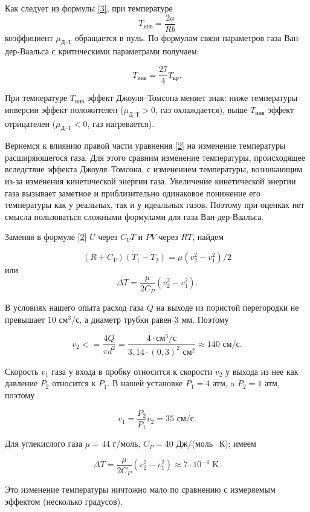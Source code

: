 \documentclass[a4paper,12pt]{article} %
\begin{document}
Как следует из формулы \eqref{3}, при температуре \[ T_{\text{инв}} = \frac{2a}{Rb} \] коэффициент $ \mu_\text{Д--Т} $ обращается в нуль. По формулам связи параметров газа Ван-дер-Ваальса с критическими параметрами получаем: 

\begin{equation}\label{4}
T_\text{инв} = \frac{27}{4} T_\text{кр}.
\end{equation}

При температуре $ T_\text{инв} $ эффект Джоуля–Томсона меняет знак: ниже температуры инверсии эффект положителен ($ \mu_\text{Д--Т} > 0 $, газ охлаждается), выше $ T_\text{инв} $ эффект отрицателен ($ \mu_\text{Д--Т} < 0 $, газ нагревается).

Вернемся к влиянию правой части уравнения \eqref{2} на изменение температуры расширяющегося газа. Для этого сравним изменение температуры, происходящее вследствие эффекта Джоуля–Томсона, с изменением температуры, возникающим из-за изменения кинетической энергии газа. Увеличение кинетической энергии газа вызывает заметное и приблизительно одинаковое понижение его температуры как у реальных, так и у идеальных газов. Поэтому при оценках нет смысла пользоваться сложными формулами для газа Ван-дер-Ваальса.

Заменяя в формуле \eqref{2} $ U $ через $ C_VT $ и $ PV $ через $ RT $, найдем

\[ \left(R+C_V\right)\left(T_1-T_2\right)=\mu\left(v_2^2-v_1^2\right)/2 \]
или
\[ \Delta T = \frac{\mu}{2C_P}\left(v_2^2-v_1^2\right). \]

В условиях нашего опыта расход газа $ Q  $ на выходе из пористой перегородки не превышает $ 10 $ см$ ^3 $/с, а диаметр трубки равен 3 мм. Поэтому

\[ v_2<=\frac{4Q}{\pi d^2} = \frac{4\cdot\text{см}^3/\text{с}}{3,14\cdot(0,3)^2\text{ см}^2} \approx 140 \text{ см}/\text{с}. \]

Скорость $ v_1 $ газа у входа в пробку относится к скорости $ v_2 $ у выхода из нее как давление $ P_2 $ относится к $ P_1 $. В нашей установке $ P_1 = 4 $ атм, a $ P_2 = 1 $ атм, поэтому

\[ v_1=\frac{P_2}{P_1}v_2 = 35 \text{ см}/\text{с}. \]

Для углекислого газа $ \mu = 44 $ г/моль, $ C_P = 40 $ Дж/(моль·К); имеем

\[ \Delta T = \frac{\mu}{2C_P}\left(v_2^2-v_1^2\right) \approx 7\cdot10^{-4} \text{ K}. \]

Это изменение температуры ничтожно мало по сравнению с измеряемым эффектом (несколько градусов).
\end{document}
